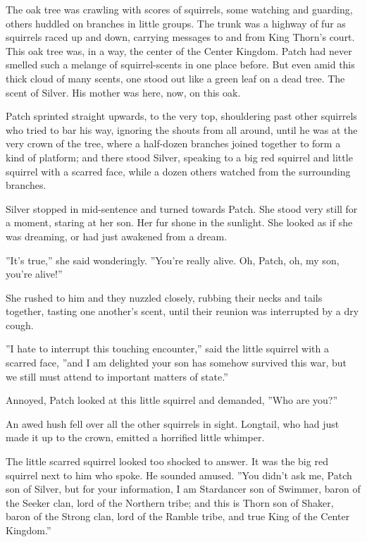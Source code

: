 \documentclass[11pt]{article}
\begin{document}
 The oak tree was crawling with scores of squirrels, some watching and guarding, others huddled on branches in little groups. The trunk was a highway of fur as squirrels raced up and down, carrying messages to and from King Thorn's court. This oak tree was, in a way, the center of the Center Kingdom. Patch had never smelled such a melange of squirrel-scents in one place before. But even amid this thick cloud of many scents, one stood out like a green leaf on a dead tree. The scent of Silver. His mother was here, now, on this oak.\par
 Patch sprinted straight upwards, to the very top, shouldering past other squirrels who tried to bar his way, ignoring the shouts from all around, until he was at the very crown of the tree, where a half-dozen branches joined together to form a kind of platform; and there stood Silver, speaking to a big red squirrel and little squirrel with a scarred face, while a dozen others watched from the surrounding branches.\par
 Silver stopped in mid-sentence and turned towards Patch. She stood very still for a moment, staring at her son. Her fur shone in the sunlight. She looked as if she was dreaming, or had just awakened from a dream.\par
 ''It's true,'' she said wonderingly. ''You're really alive. Oh, Patch, oh, my son, you're alive!''\par
 She rushed to him and they nuzzled closely, rubbing their necks and tails together, tasting one another's scent, until their reunion was interrupted by a dry cough.\par
 ''I hate to interrupt this touching encounter,'' said the little squirrel with a scarred face, ''and I am delighted your son has somehow survived this war, but we still must attend to important matters of state.''\par
 Annoyed, Patch looked at this little squirrel and demanded, ''Who are you?''\par
 An awed hush fell over all the other squirrels in sight. Longtail, who had just made it up to the crown, emitted a horrified little whimper.\par
 The little scarred squirrel looked too shocked to answer. It was the big red squirrel next to him who spoke. He sounded amused. ''You didn't ask me, Patch son of Silver, but for your information, I am Stardancer son of Swimmer, baron of the Seeker clan, lord of the Northern tribe; and this is Thorn son of Shaker, baron of the Strong clan, lord of the Ramble tribe, and true King of the Center Kingdom.''\par
\end{document}
